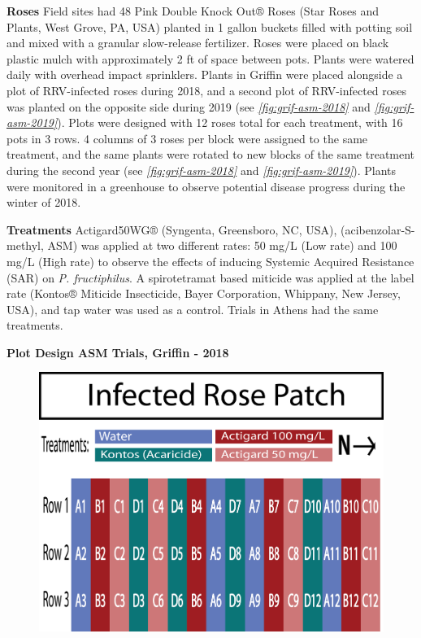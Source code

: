 \documentclass{ufdissertation}[overrideChapters] %
\begin{document}
{\textbf{Roses}
Field sites had 48 Pink Double Knock Out® Roses (Star Roses and Plants, West Grove, PA, USA) planted in 1 gallon buckets filled with potting soil and mixed with a granular slow-release fertilizer. Roses were placed on black plastic mulch with approximately 2 ft of space between pots. Plants were watered daily with overhead impact sprinklers. Plants in Griffin were placed alongside a plot of RRV-infected roses during 2018, and a second plot of RRV-infected roses was planted on the opposite side during 2019 (see \emph{\ref{fig:grif-asm-2018}} and \emph{\ref{fig:grif-asm-2019}}). Plots were designed with 12 roses total for each treatment, with 16 pots in 3 rows. 4 columns of 3 roses per block were assigned to the same treatment, and the same plants were rotated to new blocks of the same treatment during the second year (see \emph{\ref{fig:grif-asm-2018}} and \emph{\ref{fig:grif-asm-2019}}). Plants were monitored in a greenhouse to observe potential disease progress during the winter of 2018.

\textbf{Treatments}
Actigard50WG® (Syngenta, Greensboro, NC, USA), (acibenzolar-S-methyl, ASM) was applied at two different rates: 50 \si{\milli\gram}/\si{\liter} (Low rate) and 100 \si{\milli\gram}/\si{\liter} (High rate) to observe the effects of inducing Systemic Acquired Resistance (SAR) on \emph{P. fructiphilus}. A spirotetramat based miticide was applied at the label rate (Kontos® Miticide Insecticide, Bayer Corporation, Whippany, New Jersey, USA), and tap water was used as a control. Trials in Athens had the same treatments.

\textbf{Plot Design ASM Trials, Griffin - 2018}
\begin{figure}

{\centering \includegraphics[width=1\linewidth]{figure/rrv_asm_plot_2018_griffin} 

}
\end{figure}}
\end{document}
